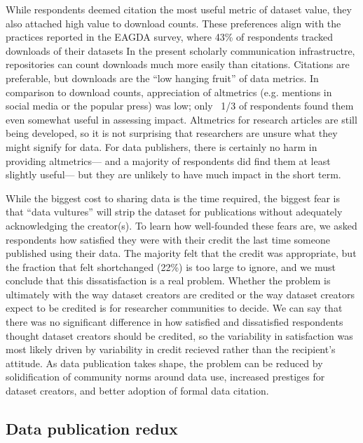 \documentclass[10pt]{article}
\begin{document}
While respondents deemed citation the most useful metric of dataset value, they also attached high value to download counts.
These preferences align with the practices reported in the EAGDA survey, where 43\% of respondents tracked downloads of their datasets\cite{bobrow_establishing_2014}
In the present scholarly communication infrastructre, repositories can count downloads much more easily than citations.
Citations are preferable, but downloads are the ``low hanging fruit'' of data metrics.
In comparison to download counts, appreciation of altmetrics (e.g. mentions in social media or the popular press) was low; only ~1/3 of respondents found them even somewhat useful in assessing impact.
Altmetrics for research articles are still being developed, so it is not surprising that researchers are unsure what they might signify for data.
For data publishers, there is certainly no harm in providing altmetrics--- and a majority of respondents did find them at least slightly useful--- but they are unlikely to have much impact in the short term.

While the biggest cost to sharing data is the time required, the biggest fear is that ``data vultures'' will strip the dataset for publications without adequately acknowledging the creator(s)\cite{kim_institutional_2012}.
To learn how well-founded these fears are, we asked respondents how satisfied they were with their credit the last time someone published using their data.
The majority felt that the credit was appropriate, but the fraction that felt shortchanged (22\%) is too large to ignore, and we must conclude that this dissatisfaction is a real problem.
Whether the problem is ultimately with the way dataset creators are credited or the way dataset creators expect to be credited is for researcher communities to decide.
We can say that there was no significant difference in how satisfied and dissatisfied respondents thought dataset creators should be credited, so the variability in satisfaction was most likely driven by variability in credit recieved rather than the recipient's attitude.
As data publication takes shape, the problem can be reduced by solidification of community norms around data use, increased prestiges for dataset creators, and better adoption of formal data citation.

\subsection*{Data publication redux}
\end{document}
